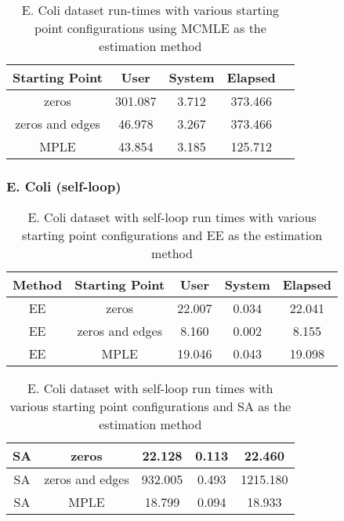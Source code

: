 \begin{table}[!ht]
\centering
 \begin{tabular}{||c | c | c | c | c||} 
 \hline
 Starting Point & User & System & Elapsed \\ 
 \hline
 zeros & 301.087 & 3.712 & 373.466 \\
 \hline
 zeros and edges & 46.978 & 3.267 & 373.466 \\ 
 \hline
 MPLE & 43.854 & 3.185 & 125.712 \\ 
 \hline
\end{tabular}
\label{t:ecoli1_mcmle}
\caption{E. Coli dataset run-times with various starting point configurations using MCMLE as the estimation method}
\end{table}

\subsubsection{E. Coli (self-loop)}

\begin{table}[!ht]
\centering
 \begin{tabular}{||c | c | c | c | c||} 
 \hline
 Method & Starting Point & User & System & Elapsed \\
 \hline\hline
 EE & zeros & 22.007	 & 0.034 & 22.041 \\ 
 \hline
 EE & zeros and edges & 8.160 & 0.002 & 8.155 \\
 \hline
 EE & MPLE & 19.046 & 0.043 & 19.098 \\
 \hline
 \end{tabular}
 \label{t:ecoli2_ee}
 \caption{E. Coli dataset with self-loop run times with various starting point configurations and EE as the estimation method}
\end{table}

\begin{table}[!ht]
\centering
\begin{tabular}{||c | c | c | c | c||}
 \hline
 SA & zeros & 22.128 & 0.113 & 22.460 \\
 \hline
 SA & zeros and edges & 932.005 & 0.493 & 1215.180 \\ 
 \hline
 SA & MPLE & 18.799 & 0.094 & 18.933 \\ 
 \hline
 \end{tabular}
 \label{t:ecoli2_sa}
 \caption{E. Coli dataset with self-loop run times with various starting point configurations and SA as the estimation method}
\end{table}

